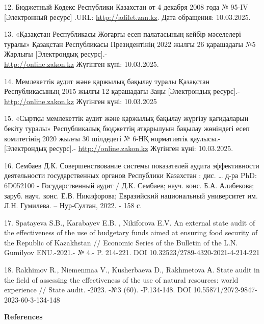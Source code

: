 \begin{references}
12. Бюджетный Кодекс Республики Казахстан от 4 декабря 2008 года № 95-IV
{[}Электронный ресурс{]} .URL:
\href{http://adilet.zan.kz/rus/docs/K080000095}{http://adilet.zan.kz}. Дата обращения:
10.03.2025.

13. «Қазақстан Республикасы Жоғарғы есеп палатасының кейбір мәселелері
туралы» Қазақстан Республикасы Президентінің 2022 жылғы 26 қарашадағы
№5 Жарлығы {[}Электрондық ресурс{]}.- \\\href{http://online.zakon.kz/}{http://online.zakon.kz} Жүгінген
күні: 10.03.2025.

14. Мемлекеттік аудит және қаржылық бақылау туралы Қазақстан
Республикасының 2015 жылғы 12 қарашадағы Заңы {[}Электрондық
ресурс{]}.- \href{http://online.zakon.kz/}{http://online.zakon.kz} Жүгінген күні: 10.03.2025

15. «Сыртқы мемлекеттік аудит және қаржылық бақылау жүргізу қағидаларын
бекіту туралы» Республикалық бюджеттің атқарылуын бақылау жөніндегі
есеп комитетінің 2020 жылғы 30 шілдедегі № 6-НҚ нормативтік
қаулысы.-{[}Электрондық ресурс{]}.- \href{http://online.zakon.kz/}{http://online.zakon.kz}
Жүгінген күні: 10.03.2025.

16. Сембаев Д.К. Совершенствование системы показателей аудита
эффективности деятельности государственных органов Республики
Казахстан : дис. \ldots{} д-ра PhD: 6D052100 - Государственный аудит /
Д.К. Сембаев; науч. конс. Б.А. Алибекова; заруб. науч. конс. Е.В.
Никифорова; Евразийский национальный университет им. Л.Н. Гумилева. --
Нур-Султан, 2022. - 158 с.

17. Spatayeva S.B., Karabayev E.B. , Nikiforova E.V. An external state
audit of the effectiveness of the use of budgetary funds aimed at
ensuring food security of the Republic of Kazakhstan // Economic
Series of the Bulletin of the L.N. Gumilyov ENU.-2021.- № 4.- P.
214-221. DOI 10.32523/2789-4320-2021-4-214-221

18. Rakhimov R., Niemenmaa V., Kusherbaeva D., Rakhmetova А. State audit
in the field of assessing the effectiveness of the use of natural
resources: world experience // State audit. -2023. -№3 (60). -P.134-148.
DOI 10.55871/2072-9847-2023-60-3-134-148
\end{references}

\begin{center}
{\bfseries References}
\end{center}

